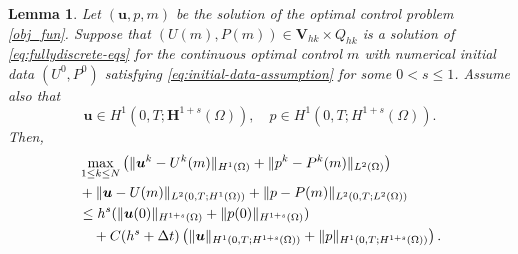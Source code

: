 \documentclass{amsart}
\newtheorem{lemma}[theorem]{Lemma}
\newcommand{\LRp}[1]{\left( #1 \right)}
\begin{document}
\begin{lemma}\label{lemma:aux-forward-error}
	Let $({\boldsymbol{u}},{p},{m})$ be the solution of the optimal control problem \eqref{obj_fun}. Suppose that $(U({m}), P({m})) \in \boldsymbol{V}_{hk} \times Q_{hk}$ is a solution of \eqref{eq:fullydiscrete-eqs} for the continuous optimal control ${m}$ with numerical initial data $(U^0, P^0)$ satisfying \eqref{eq:initial-data-assumption} for some $0<s\le 1$. Assume also that 
    \[
        \boldsymbol{u}\in H^1(0,T;\boldsymbol{H}^{1+s}(\Omega)), \quad  p\in H^1(0,T;H^{1+s}(\Omega)).
    \]
    Then, 
	\begin{align}
        \label{eq:forward-aux-estimate}
		&\max_{1\le k \le N} \LRp{\| \boldsymbol{u}^k - U^k(m)\|_{H^1(\Omega)} + \| p^k - P^k(m)\|_{L^2(\Omega)} } 
        \\
        \notag
		&+ \| \boldsymbol{u} - U(m)\|_{L^2(0,T; H^1(\Omega))} + \| p - P(m)\|_{L^2(0,T; L^2(\Omega))} 
        \\
        \notag
        &\le h^{s}(\|\boldsymbol{u}(0)\|_{H^{1+s}(\Omega)}+\|p(0)\|_{H^{1+s}(\Omega)}) 
        \\
        \notag
        &\quad + C(h^s+\Delta t)
        \left(
        \|\boldsymbol{u}\|_{H^1(0,T;H^{1+s}(\Omega))}
        +
        \|p\|_{H^1(0,T;H^{1+s}(\Omega))}
        \right) .
    \end{align}
\end{lemma}
\end{document}
